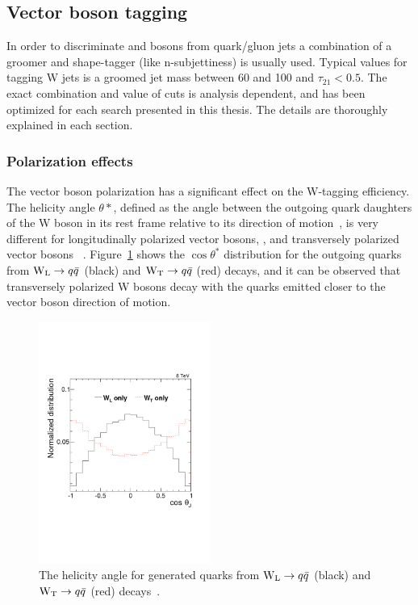 \subsection{Vector boson tagging}
In order to discriminate \PW and \PZ bosons from quark/gluon jets a combination of a groomer and shape-tagger (like n-subjettiness) is usually used.
Typical values for tagging W jets is a groomed jet mass between 60 and 100 \GeV and $\tau_{21}<0.5$. The exact combination and value of cuts is analysis dependent, and has been optimized for each search presented in this thesis. The details are thoroughly explained in each section.

\subsubsection{Polarization effects}
\label{sec:objreco:pol}
The vector boson polarization has a significant effect on the W-tagging efficiency. The helicity angle $\theta*$, defined as the angle between the outgoing quark daughters of the W boson in its rest frame relative to its direction of motion~\cite{PhysRevD.86.095031}, is very different for longitudinally polarized vector bosons, \PWL, and transversely polarized vector bosons \PWT ~\cite{Khachatryan:2014vla}. Figure~\ref{fig:objreco:wtwlcostheta} shows the $\cos \theta^*$ distribution for the outgoing quarks from $\mathrm{W}_{\mathrm{L}} \rightarrow q \bar {q}$ (black) and $\mathrm{W}_{\mathrm{T}} \rightarrow q \bar{q}$ (red) decays, and it can be observed that transversely polarized W bosons decay with the quarks emitted closer to the vector boson direction of motion.
\begin{figure}[h!] 
    \centering 
    \includegraphics[width=0.5\textwidth]{figures/event_reconstruction/cosThetaJJ_GEN.pdf}
     \caption{The helicity angle for generated quarks from $\mathrm{W}_{\mathrm{L}}\rightarrow q\bar{q}$ (black) and $\mathrm{W}_{\mathrm{T}}\rightarrow q\bar{q}$ (red) decays~\cite{Khachatryan:2014vla}.}
     \label{fig:objreco:wtwlcostheta}
 \end{figure}
